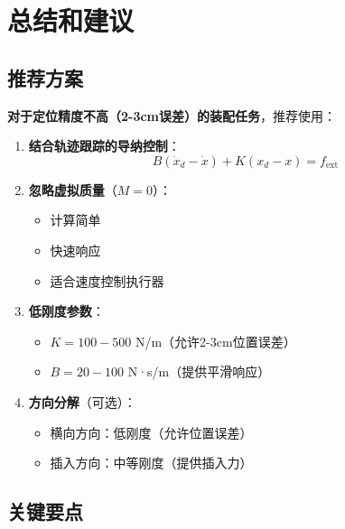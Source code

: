 \documentclass[12pt,a4paper]{article}
\begin{document}
\section{总结和建议}

\subsection{推荐方案}

\textbf{对于定位精度不高（2-3cm误差）的装配任务}，推荐使用：

\begin{enumerate}
\item \textbf{结合轨迹跟踪的导纳控制}：
\begin{equation}
B(\dot{x}_d - \dot{x}) + K(x_d - x) = f_{\text{ext}}
\end{equation}

\item \textbf{忽略虚拟质量}（$M = 0$）：
\begin{itemize}
\item 计算简单
\item 快速响应
\item 适合速度控制执行器
\end{itemize}

\item \textbf{低刚度参数}：
\begin{itemize}
\item $K = 100-500$ N/m（允许2-3cm位置误差）
\item $B = 20-100$ N·s/m（提供平滑响应）
\end{itemize}

\item \textbf{方向分解}（可选）：
\begin{itemize}
\item 横向方向：低刚度（允许位置误差）
\item 插入方向：中等刚度（提供插入力）
\end{itemize}
\end{enumerate}

\subsection{关键要点}
\end{document}
